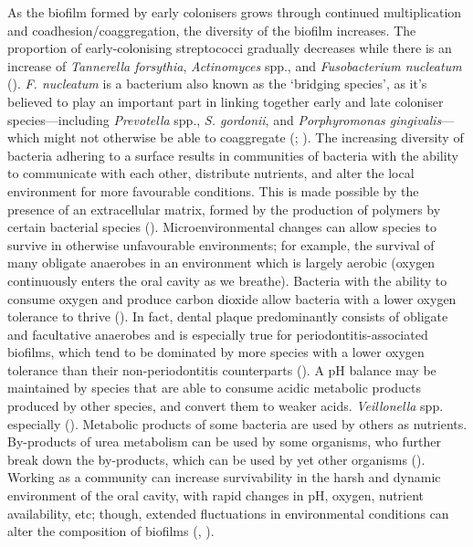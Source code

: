 \documentclass[
  b5paper,
]{book}
\begin{document}
As the biofilm formed by early colonisers grows through continued
multiplication and coadhesion/coaggregation, the diversity of the
biofilm increases. The proportion of early-colonising streptococci
gradually decreases while there is an increase of \emph{Tannerella
forsythia}, \emph{Actinomyces} spp., and \emph{Fusobacterium nucleatum}
().
\emph{F. nucleatum} is a bacterium also known as the `bridging species',
as it's believed to play an important part in linking together early and
late coloniser species---including \emph{Prevotella} spp., \emph{S.
gordonii}, and \emph{Porphyromonas gingivalis}--- which might not
otherwise be able to coaggregate
(; ). The increasing diversity of bacteria adhering to a
surface results in communities of bacteria with the ability to
communicate with each other, distribute nutrients, and alter the local
environment for more favourable conditions. This is made possible by the
presence of an extracellular matrix, formed by the production of
polymers by certain bacterial species
().
Microenvironmental changes can allow species to survive in otherwise
unfavourable environments; for example, the survival of many obligate
anaerobes in an environment which is largely aerobic (oxygen
continuously enters the oral cavity as we breathe). Bacteria with the
ability to consume oxygen and produce carbon dioxide allow bacteria with
a lower oxygen tolerance to thrive
(). In fact, dental
plaque predominantly consists of obligate and facultative anaerobes and
is especially true for periodontitis-associated biofilms, which tend to
be dominated by more species with a lower oxygen tolerance than their
non-periodontitis counterparts
(). A pH
balance may be maintained by species that are able to consume acidic
metabolic products produced by other species, and convert them to weaker
acids. \emph{Veillonella} spp. especially
(). Metabolic products
of some bacteria are used by others as nutrients. By-products of urea
metabolism can be used by some organisms, who further break down the
by-products, which can be used by yet other organisms
().
Working as a community can increase survivability in the harsh and
dynamic environment of the oral cavity, with rapid changes in pH,
oxygen, nutrient availability, etc; though, extended fluctuations in
environmental conditions can alter the composition of biofilms
(,
).
\end{document}
